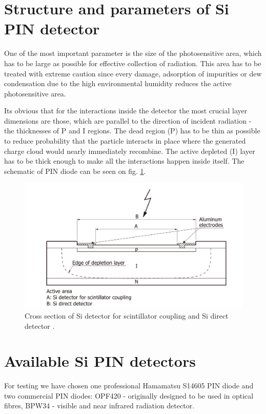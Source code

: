 \section{Structure and parameters of Si PIN detector}
One of the most important parameter is the size of the photosensitive area, which has to be large as possible for effective collection of radiation. This area has to be treated with extreme caution since every damage, adsorption of impurities or dew condensation due to the high environmental humidity reduces the active photosensitive area.

\par
Its obvious that for the interactions inside the detector the most crucial layer dimensions are those, which are parallel to the direction of incident radiation - the thicknesses of P and I regions.
The dead region (P) has to be thin as possible to reduce probability that the particle interacts in place where the generated charge cloud would nearly immediately recombine. The active depleted (I) layer has to be thick enough to make all the interactions happen inside itself. The schematic of PIN diode can be seen on fig. \ref{SiPIN}.


\begin{figure}[H]
 \centering
 \includegraphics[scale=0.35, angle = 0]{./pictures/SiPINScheme.png}
 \caption{Cross section of Si detector for scintillator coupling and Si direct detector \cite{SiPINdirect}.}
 \label{SiPIN}
 
\end{figure}



\section{Available Si PIN detectors}
For testing we have chosen one professional Hamamatsu S14605 PIN diode and two commercial PIN diodes: OPF420 - originally designed to be used in optical fibres, BPW34 - visible and near infrared radiation detector.  



